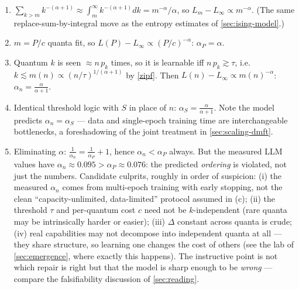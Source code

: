\documentclass[11pt]{article}
\begin{document}
\begin{solution}[ex:quanta]
\begin{enumerate}
    \item $\sum_{k>m} k^{-(\alpha+1)} \approx \int_m^\infty k^{-(\alpha+1)}dk = m^{-\alpha}/\alpha$, so $L_m - L_\infty \propto m^{-\alpha}$. (The same replace-sum-by-integral move as the entropy estimates of \cref{sec:ising-model}.)
    \item $m = P/c$ quanta fit, so $L(P)-L_\infty \propto (P/c)^{-\alpha}$: \quad $\boxed{\alpha_P = \alpha}$.
    \item Quantum $k$ is seen $\approx n\, p_k$ times, so it is learnable iff $n\, p_k \gtrsim \tau$, i.e.\ $k \lesssim m(n) \propto (n/\tau)^{1/(\alpha+1)}$ by \eqref{zipf}. Then $L(n) - L_\infty \propto m(n)^{-\alpha}$: \quad $\boxed{\alpha_n = \frac{\alpha}{\alpha+1}}$.
    \item Identical threshold logic with $S$ in place of $n$: $\boxed{\alpha_S = \frac{\alpha}{\alpha+1}}$. Note the model predicts $\alpha_n=\alpha_S$ --- data and single-epoch training time are interchangeable bottlenecks, a foreshadowing of the joint treatment in \cref{sec:scaling-dmft}.
    \item Eliminating $\alpha$: $\frac{1}{\alpha_n} = \frac{1}{\alpha_P} + 1$, hence $\alpha_n < \alpha_P$ always. But the measured LLM values have $\alpha_n \approx 0.095 > \alpha_P \approx 0.076$: the predicted \emph{ordering} is violated, not just the numbers. Candidate culprits, roughly in order of suspicion: (i) the measured $\alpha_n$ comes from multi-epoch training with early stopping, not the clean ``capacity-unlimited, data-limited'' protocol assumed in (c); (ii) the threshold $\tau$ and per-quantum cost $c$ need not be $k$-independent (rare quanta may be intrinsically harder or easier); (iii) $\Delta$ constant across quanta is crude; (iv) real capabilities may not decompose into independent quanta at all --- they share structure, so learning one changes the cost of others (see the lab of \cref{sec:emergence}, where exactly this happens). The instructive point is not which repair is right but that the model is sharp enough to be \emph{wrong} --- compare the falsifiability discussion of \cref{sec:reading}.
\end{enumerate}
\end{solution}
\end{document}
